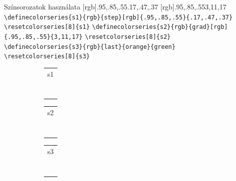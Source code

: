 \documentclass[aspectratio=1610, dvipsnames, xcolor=table]{beamer}
\begin{document}
    \begin{frame}[fragile]{Színsorozatok használata}
        [rgb]{.95,.85,.55}{.17,.47,.37}
        [rgb]{.95,.85,.55}{3,11,17}
        \verb!\definecolorseries{s1}{rgb}{step}[rgb]{.95,.85,.55}{.17,.47,.37}!
        \verb!\resetcolorseries[8]{s1}!
        \verb!\definecolorseries{s2}{rgb}{grad}[rgb]{.95,.85,.55}{3,11,17}!
        \verb!\resetcolorseries[8]{s2}! \\ 
        \verb!\definecolorseries{s3}{rgb}{last}{orange}{green}! \\
        \verb!\resetcolorseries[8]{s3}!
        
        \begin{figure}[b]    
            \begin{subfigure}[!b]{0.2\textwidth}
                \begin{tabular}{p{2cm}}
                    s1 \\ \\ \\ \\ \\ \\ \\ \\            
                \end{tabular}        
                
            \end{subfigure}
            \begin{subfigure}[!b]{0.2\textwidth}
                \begin{tabular}{p{2cm}}
                  s2  \\ \\ \\ \\ \\ \\ \\ \\            
                \end{tabular}        
                
            \end{subfigure}
            \begin{subfigure}[!b]{0.2\textwidth}
                \begin{tabular}{p{2cm}}
                    s3 \\ \\ \\ \\ \\ \\ \\ \\            
                \end{tabular}        
                

\end{subfigure}
\end{figure}
\end{frame}
\end{document}
